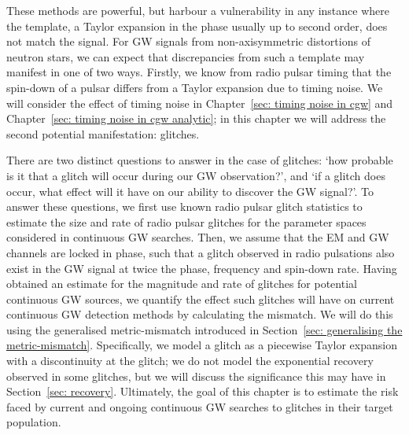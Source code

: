 \documentclass[../full_thesis/full_thesis.tex]{subfiles}
\begin{document}
These methods are powerful, but harbour a vulnerability in any instance where
the template, a Taylor expansion in the phase usually up to second order, does
not match the signal. For GW signals from non-axisymmetric distortions of neutron stars,
we can expect that discrepancies from such a template may manifest in one of
two ways. Firstly, we know from radio pulsar timing that the spin-down of a pulsar
differs from a Taylor expansion due to timing noise. We will
consider the effect of timing noise in Chapter~\ref{sec: timing noise in cgw}
and Chapter~\ref{sec: timing noise in cgw analytic};
in this chapter we will
address the second potential manifestation: glitches.

There are two distinct questions to answer in the case of glitches: `how
probable is it that a glitch will occur during our GW observation?', and `if a
glitch does occur, what effect will it have on our ability to discover the GW
signal?'. To answer these questions, we first use known radio pulsar glitch
statistics to estimate the size and rate of radio pulsar glitches for the
parameter spaces considered in continuous GW searches. Then, we assume that the
EM and GW channels are locked in phase, such that a glitch observed in radio
pulsations also exist in the GW signal at twice the phase, frequency and
spin-down rate. Having obtained an estimate for the magnitude and rate of glitches
for potential continuous GW sources, we quantify the effect such glitches will
have on current continuous GW detection methods by calculating the mismatch. We
will do this using the generalised metric-mismatch introduced in Section~\ref{sec:
generalising the metric-mismatch}. Specifically, we model a glitch as a
piecewise Taylor expansion with a discontinuity at the glitch; we do not model
the exponential recovery observed in some glitches, but we will discuss the
significance this may have in Section~\ref{sec: recovery}. Ultimately, the goal of
this chapter is to estimate the risk faced by current and ongoing continuous GW
searches to glitches in their target population.
\end{document}
